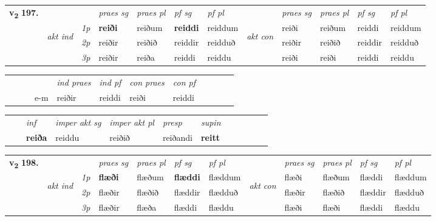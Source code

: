 \begin{tabular}{llllllllllll} \toprule
\multirow{4}{*}{{{\textbf{v{\textsubscript{2}}} \Large{\textbf{197.}}}}}  & &   &  \textit{praes sg}  & \textit{praes pl}  &\textit{ pf sg} & \textit{pf pl} &  &  \textit{praes sg}  & \textit{praes pl}  & \textit{pf sg} & \textit{pf pl } \\*
	\cmidrule{4-7} \cmidrule{9-12}
 & \multirow{3}{*}{\begin{turn}{90}\textit{akt ind}\end{turn}} & {\textit{1p}} & \textbf{reiði} & reiðum    & \textbf{reiddi} & reiddum & \multirow{3}{*}{\begin{turn}{90}\textit{akt con}\end{turn}} &reiði & reiðum & reiddi & reiddum\\*
& &  {\textit{2p}} &  reiðir  & reiðið   & reiddir & reidduð & & reiðir & reiðið & reiddir & reidduð \\*
& &  {\textit{3p}} & reiðir & reiða   & reiddi & reiddu & & reiði & reiði& reiddi & reiddu  \\*
\cmidrule{4-7} \cmidrule{9-12}
\end{tabular}


\begin{tabular}{llllllllllll}
 & &  & &  \textit{ind praes} & \textit{ind pf} & \textit{con praes} & \textit{con pf} \\*
&  & & e-m & reiðir & reiddi & reiði & reiddi \\*
\cmidrule{5-9}
\end{tabular}


\begin{tabular}{llllllllllll}
 & & \textit{inf} & \textit{imper akt sg} & \textit{imper akt pl}   & \textit{presp} & \textit{supin}       \\*
  & & \textbf{reiða} & reiddu  & reiðið   & reiðandi &  \textbf{reitt}   \\*
\cmidrule{1-12}
\end{tabular}



\begin{tabular}{llllllllllll} \toprule
\multirow{4}{*}{{{\textbf{v{\textsubscript{2}}} \Large{\textbf{198.}}}}}  & &   &  \textit{praes sg}  & \textit{praes pl}  &\textit{ pf sg} & \textit{pf pl} &  &  \textit{praes sg}  & \textit{praes pl}  & \textit{pf sg} & \textit{pf pl } \\*
	\cmidrule{4-7} \cmidrule{9-12}
 & \multirow{3}{*}{\begin{turn}{90}\textit{akt ind}\end{turn}} & {\textit{1p}} & \textbf{flæði} & flæðum    & \textbf{flæddi} & flæddum & \multirow{3}{*}{\begin{turn}{90}\textit{akt con}\end{turn}} &flæði & flæðum & flæddi & flæddum\\*
& &  {\textit{2p}} &  flæðir  & flæðið   & flæddir & flædduð & & flæðir & flæðið & flæddir & flædduð \\*
& &  {\textit{3p}} & flæðir & flæða   & flæddi & flæddu & & flæði & flæði& flæddi & flæddu  \\*
\cmidrule{4-7} \cmidrule{9-12}
\end{tabular}


